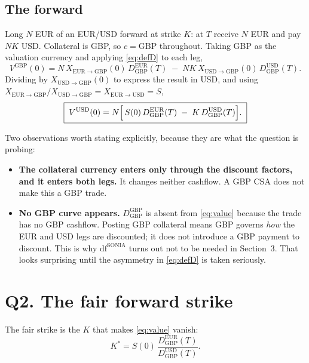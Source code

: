 \documentclass[11pt]{article}
\newcommand{\D}[2]{D_{#1}^{#2}}
\begin{document}
\subsection{The forward}

Long $N$ EUR of an EUR/USD forward at strike $K$: at $T$ receive $N$ EUR and pay $NK$
USD. Collateral is GBP, so $c = \mathrm{GBP}$ throughout. Taking GBP as the valuation
currency and applying \eqref{eq:defD} to each leg,
\[
  V^{\mathrm{GBP}}(0)
  = N\,X_{\mathrm{EUR}\to\mathrm{GBP}}(0)\,\D{\mathrm{GBP}}{\mathrm{EUR}}(T)
  \;-\; N K\,X_{\mathrm{USD}\to\mathrm{GBP}}(0)\,\D{\mathrm{GBP}}{\mathrm{USD}}(T).
\]
Dividing by $X_{\mathrm{USD}\to\mathrm{GBP}}(0)$ to express the result in USD, and using
$X_{\mathrm{EUR}\to\mathrm{GBP}}/X_{\mathrm{USD}\to\mathrm{GBP}} = X_{\mathrm{EUR}\to\mathrm{USD}} = S$,
\begin{equation}
  \boxed{\;
  V^{\mathrm{USD}}(0)
  = N\Bigl[\,S(0)\,\D{\mathrm{GBP}}{\mathrm{EUR}}(T)
  \;-\; K\,\D{\mathrm{GBP}}{\mathrm{USD}}(T)\Bigr].\;}
  \label{eq:value}
\end{equation}

Two observations worth stating explicitly, because they are what the question is probing:

\begin{itemize}[leftmargin=*]
\item \textbf{The collateral currency enters only through the discount factors, and it
  enters both legs.} It changes neither cashflow. A GBP CSA does not make this a GBP
  trade.
\item \textbf{No GBP curve appears.} $\D{\mathrm{GBP}}{\mathrm{GBP}}$ is absent from
  \eqref{eq:value} because the trade has no GBP cashflow. Posting GBP collateral means
  GBP governs \emph{how} the EUR and USD legs are discounted; it does not introduce a GBP
  payment to discount. This is why $\mathrm{df}^{\mathrm{SONIA}}$ turns out not to be
  needed in Section~3. That looks surprising until the asymmetry in
  \eqref{eq:defD} is taken seriously.
\end{itemize}

\section{Q2. The fair forward strike}

The fair strike is the $K$ that makes \eqref{eq:value} vanish:
\begin{equation}
  \boxed{\;
  K^\ast = S(0)\,
  \frac{\D{\mathrm{GBP}}{\mathrm{EUR}}(T)}{\D{\mathrm{GBP}}{\mathrm{USD}}(T)}.\;}
  \label{eq:strike}
\end{equation}
\end{document}
